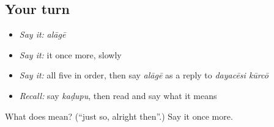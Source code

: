 \subsection*{Your turn}
\begin{itemize}
\raggedright
  \item \emph{Say it:} \emph{alāgē}
  \item \emph{Say it:} it once more, slowly
  \item \emph{Say it:} all five in order, then say \emph{alāgē} as a reply to \emph{dayacēsi kūrcō}
  \item \emph{Recall:} say \emph{kaḍupu}, then read \textbf{} and say what it means
\end{itemize}

\begin{tcolorbox}[breakable,colback=teal!4,colframe=teal!35!black,title={Before you move on}]
What does  mean? (\textquotedblleft{}just so, alright then\textquotedblright{}.) Say it once more.
\end{tcolorbox}
